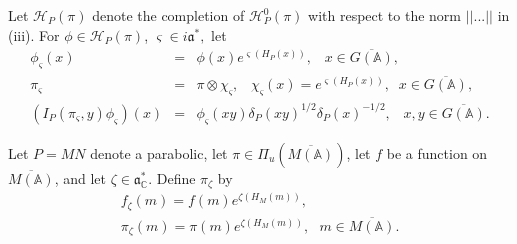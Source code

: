 Let ${\mathcal H}_P(\pi )$ denote the completion of ${\mathcal H}_P^0(\pi )$ with
respect to the norm $||...||$ in (iii). For
$\phi \in {\mathcal H}_P(\pi )$, $\varsigma \in i{\mathfrak{a}}^{*},$ let
\begin{eqnarray*}
\phi _\varsigma (x)
&=&\phi (x)e^{\varsigma (H_P(x))},\;\;\;x\in \overline{G({\mathbb{A}})},
\\
\pi _\varsigma  &=&\pi \otimes \chi _\varsigma ,\;\;\;\chi _\varsigma
(x)=e^{\varsigma (H_P(x))},\;\;x\in \overline{G({\mathbb{A}})}, \\
(I_P(\pi _\varsigma ,y)\phi _\varsigma )(x) &=&\phi _\varsigma (xy)\delta
_P(xy)^{1/2}\delta _P(x)^{-1/2},\;\;\;x,y\in \overline{G({\mathbb{A}})}.
\end{eqnarray*}

Let $P=MN$ denote a parabolic, let $\pi \in \Pi _u(\overline{M({\mathbb{A}})})$,
let $f$ be a function on $\overline{M({\mathbb{A}})}$,
and let $\zeta\in {\mathfrak{a}}^*_{\mathbb{C}}$. Define $\pi_\zeta$ by
\begin{equation}\label{eq:5.8}
\begin{array}{c}
f_\zeta (m)=f(m)e^{\zeta(H_M(m))},\\
\pi_\zeta(m)=\pi(m)e^{\zeta(H_M(m))},\ \ \ m\in \overline{M({\mathbb{A}})}.
\end{array}
\end{equation}

